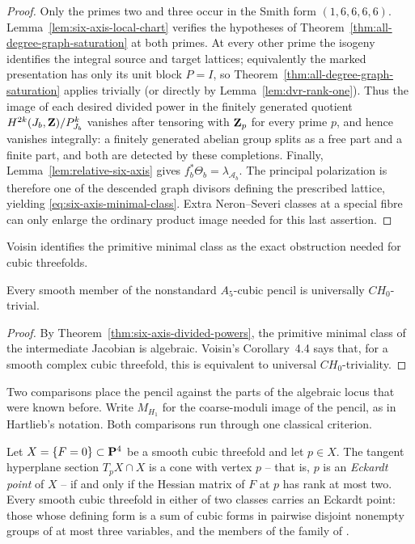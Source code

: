\begin{proof}
Only the primes two and three occur in the Smith form
\((1,6,6,6,6)\).  Lemma~\ref{lem:six-axis-local-chart} verifies the
hypotheses of Theorem~\ref{thm:all-degree-graph-saturation} at both primes.
At every other prime the isogeny identifies the integral source and target
lattices; equivalently the marked presentation has only its unit block
\(P=I\), so Theorem~\ref{thm:all-degree-graph-saturation} applies trivially
(or directly by Lemma~\ref{lem:dvr-rank-one}).  Thus the image of each
desired divided power in the finitely
generated quotient \(H^{2k}(J_b,\mathbf Z)/P_{J_b}^k\) vanishes after tensoring with
\(\mathbf Z_p\) for every prime \(p\), and hence vanishes integrally: a finitely
generated abelian group splits as a free part and a finite part, and both are
detected by these completions.  Finally,
Lemma~\ref{lem:relative-six-axis} gives
\(f_b^*\Theta_b=\lambda_{\mathcal A_b}\).  The principal polarization is
therefore one of the descended graph divisors defining the prescribed
lattice, yielding
\eqref{eq:six-axis-minimal-class}.  Extra Neron--Severi classes at
a special fibre can only enlarge the ordinary product image needed for this
last assertion.
\end{proof}

Voisin identifies the primitive minimal class as the exact obstruction needed
for cubic threefolds.

\begin{corollary}
\label{cor:universal-ch0}
%
%
Every smooth member of the nonstandard \(A_5\)-cubic pencil is universally
\(CH_0\)-trivial.
\end{corollary}

\begin{proof}
By Theorem~\ref{thm:six-axis-divided-powers}, the primitive minimal class of
the intermediate Jacobian is algebraic.  Voisin's Corollary~4.4
\cite{Voisin} says that, for a smooth complex cubic threefold, this is
equivalent to universal \(CH_0\)-triviality.
\end{proof}

Two comparisons place the pencil against the parts of the algebraic locus that
were known before.  Write \(M_{H_1}\) for the coarse-moduli image of the
pencil, as in Hartlieb's notation.  Both comparisons run through one classical
criterion.

\begin{lemma}
\label{lem:eckardt-rank}
%
%
Let \(X=\{F=0\}\subset\mathbf P^4\) be a smooth cubic threefold and let \(p\in X\).
The tangent hyperplane section \(T_pX\cap X\) is a cone with vertex \(p\) --
that is, \(p\) is an \emph{Eckardt point} of \(X\) -- if and only if the
Hessian matrix of \(F\) at \(p\) has rank at most two.  Every smooth cubic
threefold in either of two classes carries an Eckardt point: those whose
defining form is a sum of cubic forms in pairwise disjoint nonempty groups of
at most three variables, and the members of the family of
\cite[Theorem~3.3]{YYZ}.
\end{lemma}

